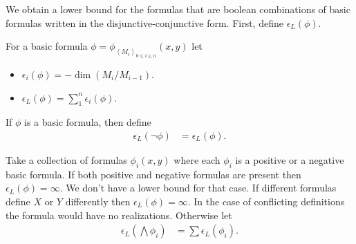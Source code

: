 \documentclass{amsart}
\newcommand{\X}{X}
\newcommand{\Y}{Y}
\newcommand{\paren}[1]{\left(#1\right)}
\newcommand{\agl}[1]{\left\langle #1 \right\rangle}
\begin{document}
We obtain a lower bound for the formulas that are boolean combinations of basic formulas written in the disjunctive-conjunctive form.
First, define $\epsilon_L(\phi)$.

\begin{Definition} 
  For a basic formula $\phi = \phi_{\agl{M_i}_{0 \leq i \leq n}}(x, y)$ let
  \begin{itemize}
  \item $\epsilon_i(\phi) = -\dim \paren{M_i/M_{i-1}}$.
  \item $\epsilon_L(\phi) = \sum_1^{n} \epsilon_i(\phi)$.
  \end{itemize}
\end{Definition}

\begin{Definition}[Negation]
  If $\phi$ is a basic formula, then define
  \begin{align*}
    \epsilon_L(\neg \phi) &= \epsilon_L(\phi).
  \end{align*}
\end{Definition}

\begin{Definition}[Conjunction]
  Take a collection of formulas $\phi_i(x, y)$ where each $\phi_i$ is a positive or a negative basic formula.
  If both positive and negative formulas are present then $\epsilon_L(\phi) = \infty$.
  We don't have a lower bound for that case.
  If different formulas define $\X$ or $\Y$ differently then $\epsilon_L(\phi) = \infty$.
  In the case of conflicting definitions the formula would have no realizations.
  Otherwise let
  \begin{align*}
    \epsilon_L\paren{\bigwedge \phi_i} &= \sum \epsilon_L(\phi_i).
  \end{align*}
\end{Definition}
\end{document}
